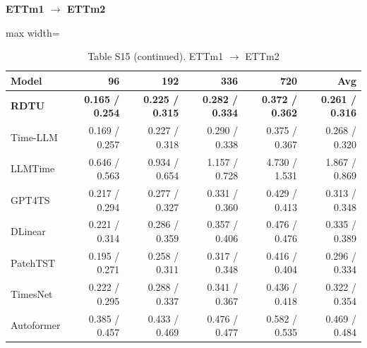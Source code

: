 \begin{table}[H]\centering\small
\caption*{Table S15 (continued). ETTm1 $\to$ ETTm2}
\textbf{ETTm1 $\to$ ETTm2}\par\smallskip
\begin{adjustbox}{max width=\linewidth}\begin{tabular}{lrrrrr}\toprule
\textbf{Model} & \textbf{96} & \textbf{192} & \textbf{336} & \textbf{720} & \textbf{Avg}\\\midrule
\rowcolor{blue!5}
\textbf{RDTU} & \textbf{0.165 / 0.254} & \textbf{0.225 / 0.315} & \textbf{0.282 / 0.334} & \textbf{0.372 / 0.362} & \textbf{0.261 / 0.316}\\
Time-LLM & 0.169 / 0.257 & 0.227 / 0.318 & 0.290 / 0.338 & 0.375 / 0.367 & 0.268 / 0.320\\
LLMTime & 0.646 / 0.563 & 0.934 / 0.654 & 1.157 / 0.728 & 4.730 / 1.531 & 1.867 / 0.869\\
GPT4TS & 0.217 / 0.294 & 0.277 / 0.327 & 0.331 / 0.360 & 0.429 / 0.413 & 0.313 / 0.348\\
DLinear & 0.221 / 0.314 & 0.286 / 0.359 & 0.357 / 0.406 & 0.476 / 0.476 & 0.335 / 0.389\\
PatchTST & 0.195 / 0.271 & 0.258 / 0.311 & 0.317 / 0.348 & 0.416 / 0.404 & 0.296 / 0.334\\
TimesNet & 0.222 / 0.295 & 0.288 / 0.337 & 0.341 / 0.367 & 0.436 / 0.418 & 0.322 / 0.354\\
Autoformer & 0.385 / 0.457 & 0.433 / 0.469 & 0.476 / 0.477 & 0.582 / 0.535 & 0.469 / 0.484\\
\bottomrule\end{tabular}\end{adjustbox}\end{table}
